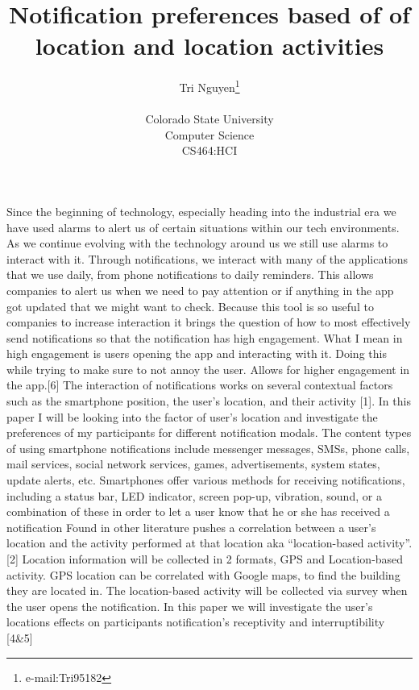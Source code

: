 \documentclass{vgtc}                          %
\title{Notification preferences based of of location and location activities}
\author{Tri Nguyen\thanks{e-mail:Tri95182}\\ %
     \parbox{1.4in}{\scriptsize \centering Colorado State University \\ Computer Science\\ CS464:HCI}}
\begin{document}


\maketitle

Since the beginning of technology, especially heading into the industrial era we have used alarms to alert us of certain situations within our tech environments. As we continue evolving with the technology around us we still use alarms to interact with it. Through notifications, we interact with many of the applications that we use daily, from phone notifications to daily reminders. This allows companies to alert us when we need to pay attention or if anything in the app got updated that we might want to check. Because this tool is so useful to companies to increase interaction it brings the question of how to most effectively send notifications so that the notification has high engagement. 
What I mean in high engagement is users opening the app and interacting with it. Doing this while trying to make sure to not annoy the user. Allows for higher engagement in the app.[6] 
The interaction of notifications works on several contextual factors such as the smartphone position, the user’s location, and their activity [1]. In this paper I will be looking into the factor of user’s location and investigate the preferences of my participants for different notification modals.
The content types of using smartphone notifications include messenger messages, SMSs, phone calls, mail services, social network services, games, advertisements, system states, update alerts, etc. Smartphones offer various methods for receiving notifications, including a status bar, LED indicator, screen pop-up, vibration, sound, or a combination of these in order to let a user know that he or she has received a notification 
Found in other literature pushes a correlation between a user’s location and the activity performed at that location aka “location-based activity”.[2] Location information will be collected in 2 formats, GPS and Location-based activity. GPS location can be correlated with Google maps, to find the building they are located in. The location-based activity will be collected via survey when the user opens the notification. In this paper we will investigate the user’s locations effects on participants notification’s receptivity and interruptibility [4&5]
\end{document}
